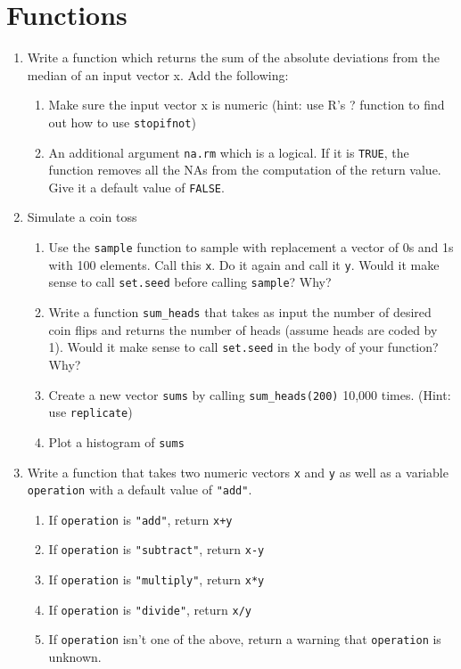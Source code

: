 \documentclass{article}
\begin{document}
\section*{Functions}

\begin{enumerate}

\item Write a function which returns the sum of the absolute deviations from the
median of an input vector x.  Add the following:
    \begin{enumerate}
    \item Make sure the input vector x is numeric
          (hint: use R's ? function to find out how to use \texttt{stopifnot})
    \item An additional argument \texttt{na.rm} which is a logical.  If it is
          \texttt{TRUE}, the function removes all the NAs from the computation
          of the return value.  Give it a default value of \texttt{FALSE}.
    \end{enumerate}

\item Simulate a coin toss
    \begin{enumerate}
    \item Use the \texttt{sample} function to sample with replacement a vector
          of 0s and 1s with 100 elements.  Call this \texttt{x}.  Do it again
          and call it \texttt{y}.  Would it make sense to call \texttt{set.seed}
          before calling \texttt{sample}?  Why?
    \item Write a function \texttt{sum\_heads} that takes as input the number of
          desired coin flips and returns the number of heads (assume heads are
          coded by 1). Would it make sense to call \texttt{set.seed} in the body
          of your function?  Why?
    \item Create a new vector \texttt{sums} by calling \texttt{sum\_heads(200)}
          10,000 times. (Hint: use \texttt{replicate})
    \item Plot a histogram of \texttt{sums}
    \end{enumerate}

\item Write a function that takes two numeric vectors \texttt{x} and \texttt{y}
      as well as a variable \texttt{operation} with a default value of \texttt{"add"}.
    \begin{enumerate}
    \item If \texttt{operation} is \texttt{"add"}, return \texttt{x+y}
    \item If \texttt{operation} is \texttt{"subtract"}, return \texttt{x-y}
    \item If \texttt{operation} is \texttt{"multiply"}, return \texttt{x*y}
    \item If \texttt{operation} is \texttt{"divide"}, return \texttt{x/y}
    \item If \texttt{operation} isn't one of the above, return a warning that
          \texttt{operation} is unknown.
    \end{enumerate}


\end{enumerate}
\end{document}
